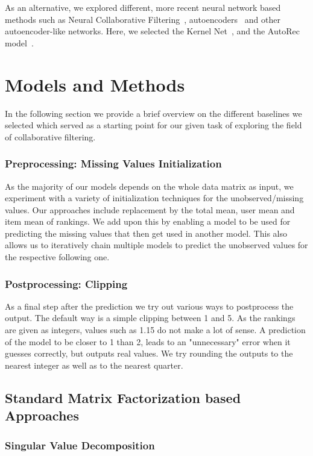 \documentclass[10pt,conference,compsocconf]{IEEEtran}
\begin{document}
    As an alternative, we explored different, more recent neural network based methods such as Neural Collaborative Filtering~\cite{DBLP:journals/corr/abs-1708-05031}, autoencoders~\cite{inproceedings} and other autoencoder-like networks.
    Here, we selected the Kernel Net~\cite{pmlr-v80-muller18a}, and the AutoRec model~\cite{inproceedings}.


    \section{Models and Methods}
    In the following section we provide a brief overview on the different baselines we selected which served as a starting point for our given task of exploring the field of collaborative filtering.

    \subsubsection{Preprocessing: Missing Values Initialization}
    As the majority of our models depends on the whole data matrix as input, we experiment with a variety of initialization techniques for the unobserved/missing values.
    Our approaches include replacement by the total mean, user mean and item mean of rankings.
    We add upon this by enabling a model to be used for predicting the missing values that then get used in another model.
    This also allows us to iteratively chain multiple models to predict the unobserved values for the respective following one.

    \subsubsection{Postprocessing: Clipping}
    As a final step after the prediction we try out various ways to postprocess the output.
    The default way is a simple clipping between 1 and 5.
    As the rankings are given as integers, values such as 1.15 do not make a lot of sense.
    A prediction of the model to be closer to 1 than 2, leads to an "unnecessary" error when it guesses correctly, but outputs real values.
    We try rounding the outputs to the nearest integer as well as to the nearest quarter.

    \subsection{Standard Matrix Factorization based Approaches}

    \subsubsection{Singular Value Decomposition}
    
\end{document}
